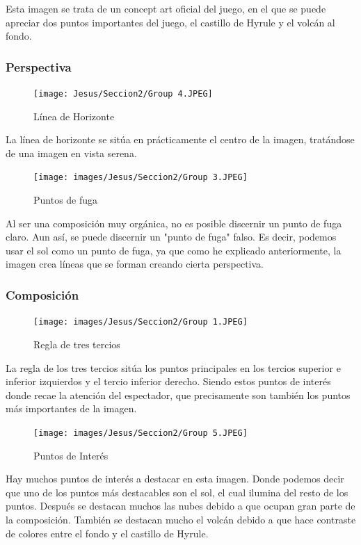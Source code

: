 \documentclass[12pt]{article}
\begin{document}
        Esta imagen se trata de un concept art oficial del juego, en el que se puede apreciar dos puntos importantes del juego, el castillo de Hyrule y el volcán al fondo. 

        \subsubsection{Perspectiva}
        \begin{figure}[H]
          \centering
          \texttt{[image: Jesus/Seccion2/Group 4.JPEG]}
          \caption{Línea de Horizonte}
        \end{figure}

        La línea de horizonte se sitúa en prácticamente el centro de la imagen, tratándose de una imagen en vista serena. 

        \newpage

        \begin{figure}[H]
          \centering
          \texttt{[image: images/Jesus/Seccion2/Group 3.JPEG]}
          \caption{Puntos de fuga}
        \end{figure}
        Al ser una composición muy orgánica, no es posible discernir un punto de fuga claro. Aun así, se puede discernir un "punto de fuga" falso. Es decir, podemos usar el sol como un punto de fuga, ya que como he explicado anteriormente, la imagen crea líneas que se forman creando cierta perspectiva.

        \newpage

        
        \subsubsection{Composición}
        
          \begin{figure}[H]
            \centering
            \texttt{[image: images/Jesus/Seccion2/Group 1.JPEG]}
            \caption{Regla de tres tercios}
          \end{figure}
          
          La regla de los tres tercios sitúa los puntos principales en los tercios superior e inferior izquierdos y el tercio inferior derecho. 
          Siendo estos puntos de interés donde recae la atención del espectador, que precisamente son también los puntos más importantes de la imagen.
          \newpage
          \begin{figure}[H]
            \centering
            \texttt{[image: images/Jesus/Seccion2/Group 5.JPEG]}
            \caption{\small {Puntos de Interés}}
          \end{figure}
          Hay muchos puntos de interés a destacar en esta imagen. Donde podemos decir que uno de los puntos más destacables son el sol, el cual ilumina del resto de los puntos.
          Después se destacan muchos las nubes debido a que ocupan gran parte de la composición. 
          También se destacan mucho el volcán debido a que hace contraste de colores entre el fondo y el castillo de Hyrule. 
\end{document}
